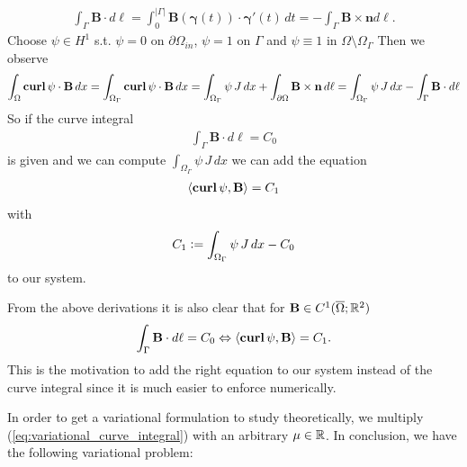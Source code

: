 \documentclass[../master_thesis.tex]{subfiles}
\begin{document}
\begin{align*}
    \int_\Gamma \mathbf{B}\cdot d\ell= \int_0^{|\Gamma|} \mathbf{B}(\bm{\gamma}(t)) \cdot \bm{\gamma}'(t) \, dt 
    = -\int_\Gamma  \mathbf{B}\times \mathbf{n} d\ell.
\end{align*}
Choose $\psi \in H^1$ s.t. $\psi = 0$ on $\partial \Omega_{in}$, $\psi = 1$ on 
$\Gamma$ and $\psi \equiv 1$ in $\Omega \setminus \Omega_\Gamma$
Then we observe 
\begin{align*}
    \int_\Omega \veccurl \psi \cdot \mathbf{B} \, dx = 
    \int_{\Omega_\Gamma} \veccurl \psi \cdot \mathbf{B} \, dx = 
    \int_{\Omega_\Gamma} \psi \, J \, dx + \int_{\partial\Omega} \mathbf{B} \times \mathbf{n}\, d\ell
    = \int_{\Omega_\Gamma} \psi \, J \, dx - \int_\Gamma \mathbf{B}\cdot d\ell
\end{align*}
So if the curve integral 
\begin{align*}
    \int_\Gamma \mathbf{B} \cdot d\ell = C_0
\end{align*}
is given and we can compute $\int_{\Omega_\Gamma} \psi \, J \, dx$
we can add the equation
\begin{align}
    \langle \veccurl \psi, \mathbf{B} \rangle = C_1 \label{eq:variational_curve_integral}
\end{align}
with 
\begin{align*}
    C_1 \vcentcolon= \int_{\Omega_\Gamma} \psi \, J \, dx - C_0
\end{align*}
to our system.

From the above derivations it is also clear that for $\mathbf{B} \in C^1(\overline{\Omega};\real^2)$ 
\begin{align*}
    \int_\Gamma \mathbf{B} \cdot d\ell = C_0 
    \Leftrightarrow \langle \veccurl \psi, \mathbf{B} \rangle = C_1.
\end{align*}
This is the motivation to add the right equation to our system instead
of the curve integral since it is much easier 
to enforce numerically.

In order to get a variational 
formulation to study theoretically,
 we multiply (\ref{eq:variational_curve_integral}) with an arbitrary $\mu \in \real$. 
In conclusion, we have the following variational problem:
\end{document}
